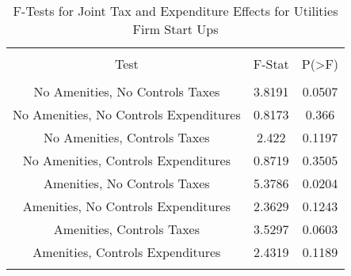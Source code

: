 
\begin{table}[!htbp] \centering 
  \caption{F-Tests for Joint Tax and Expenditure Effects for Utilities Firm Start Ups} 
  \label{22Ftests} 
\begin{tabular}{@{\extracolsep{5pt}} ccc} 
\\[-1.8ex]\hline 
\hline \\[-1.8ex] 
Test & F-Stat & P(\textgreater F) \\ 
\hline \\[-1.8ex] 
No Amenities, No Controls Taxes & 3.8191 & 0.0507 \\ 
No Amenities, No Controls Expenditures & 0.8173 & 0.366 \\ 
No Amenities, Controls Taxes & 2.422 & 0.1197 \\ 
No Amenities, Controls Expenditures & 0.8719 & 0.3505 \\ 
Amenities, No Controls Taxes & 5.3786 & 0.0204 \\ 
Amenities, No Controls Expenditures & 2.3629 & 0.1243 \\ 
Amenities, Controls Taxes & 3.5297 & 0.0603 \\ 
Amenities, Controls Expenditures & 2.4319 & 0.1189 \\ 
\hline \\[-1.8ex] 
\end{tabular} 
\end{table} 
